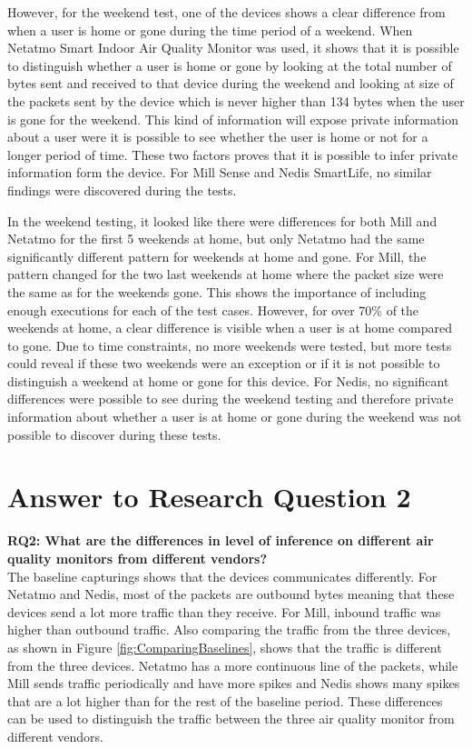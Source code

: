 However, for the weekend test, one of the devices shows a clear difference from when a user is home or gone during the time period of a weekend. When Netatmo Smart Indoor Air Quality Monitor was used, it shows that it is possible to distinguish whether a user is home or gone by looking at the total number of bytes sent and received to that device during the weekend and looking at size of the packets sent by the device which is never higher than 134 bytes when the user is gone for the weekend. This kind of information will expose private information about a user were it is possible to see whether the user is home or not for a longer period of time. These two factors proves that it is possible to infer private information form the device. For Mill Sense and Nedis SmartLife, no similar findings were discovered during the tests. 

In the weekend testing, it looked like there were differences for both Mill and Netatmo for the first 5 weekends at home, but only Netatmo had the same significantly different pattern for weekends at home and gone. For Mill, the pattern changed for the two last weekends at home where the packet size were the same as for the weekends gone. This shows the importance of including enough executions for each of the test cases. However, for over 70\% of the weekends at home, a clear difference is visible when a user is at home compared to gone. Due to time constraints, no more weekends were tested, but more tests could reveal if these two weekends were an exception or if it is not possible to distinguish a weekend at home or gone for this device. For Nedis, no significant differences were possible to see during the weekend testing and therefore private information about whether a user is at home or gone during the weekend was not possible to discover during these tests. 

\section{Answer to Research Question 2}
\textbf{\gls{RQ}2: What are the differences in level of inference on different air quality monitors from different vendors?}\\

The baseline capturings shows that the devices communicates differently. For Netatmo and Nedis, most of the packets are outbound bytes meaning that these devices send a lot more traffic than they receive. For Mill, inbound traffic was higher than outbound traffic. Also comparing the traffic from the three devices, as shown in Figure \ref{fig:ComparingBaselines}, shows that the traffic is different from the three devices. Netatmo has a more continuous line of the packets, while Mill sends traffic periodically and have more spikes and Nedis shows many spikes that are a lot higher than for the rest of the baseline period. These differences can be used to distinguish the traffic between the three air quality monitor from different vendors. 

